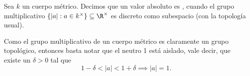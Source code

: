 \documentclass[teoria-numeros.tex]{subfiles}
\begin{document}





\begin{mydef}
	Sea $k$ un cuerpo métrico.
	Decimos que un valor absoluto es ,
	cuando el grupo multiplicativo $\{ |a| : a \in k^\times \} \subseteq \R^\times$ es discreto como subespacio (con la topología usual).
\end{mydef}
Como el grupo multiplicativo de un cuerpo métrico es claramente un grupo topológico, entonces basta notar que el neutro 1 está aislado, vale decir,
que existe un $\delta > 0$ tal que
$$ 1 - \delta < |a| < 1 + \delta \implies |a| = 1. $$
\end{document}
